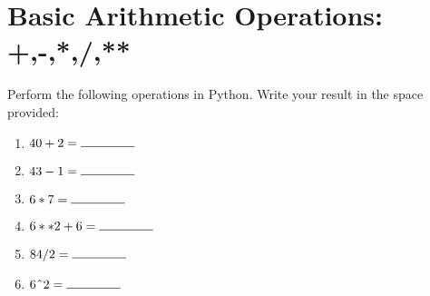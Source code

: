 \documentclass[paper=a4, fontsize=11pt]{scrartcl} %
\numberwithin{equation}{section} %
\numberwithin{figure}{section} %
\numberwithin{table}{section} %
\begin{document}






\pagebreak

\section{Basic Arithmetic Operations: +,-,*,/,**}

Perform the following operations in Python.  Write your result in the space provided:



\begin{multicols}{3}

\begin{enumerate}[label=\Alph*.]

\item $40 + 2 = \rule{1.5cm}{0.15mm}$

\item $43 - 1 = \rule{1.5cm}{0.15mm}$

\item $6 * 7 = \rule{1.5cm}{0.15mm}$

\item $6 ** 2 + 6 = \rule{1.5cm}{0.15mm}$

\item $84/2 = \rule{1.5cm}{0.15mm}$

\item $6 \hspace{1mm} \hat{ } \hspace{1mm} 2 = \rule{1.5cm}{0.15mm}$


\end{enumerate}

\end{multicols}
\end{document}
